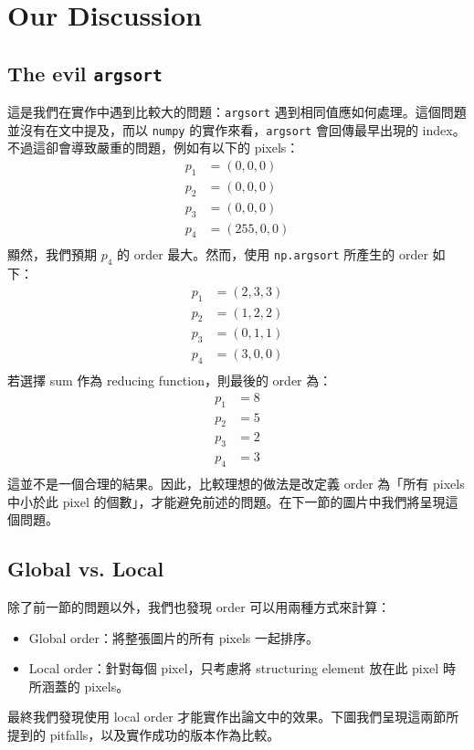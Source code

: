 \section*{Our Discussion}

\subsection*{The evil \texttt{argsort}}
這是我們在實作中遇到比較大的問題：\texttt{argsort} 遇到相同值應如何處理。這個問題並沒有在文中提及，而以 \texttt{numpy} 的實作來看，\texttt{argsort} 會回傳最早出現的 index。不過這卻會導致嚴重的問題，例如有以下的 pixels：
\begin{align*}
    p_1 & = (0, 0, 0)   \\
    p_2 & = (0, 0, 0)   \\
    p_3 & = (0, 0, 0)   \\
    p_4 & = (255, 0, 0) \\
\end{align*}
顯然，我們預期 $p_4$ 的 order 最大。然而，使用 \texttt{np.argsort} 所產生的 order 如下：
\begin{align*}
    p_1 & = (2, 3, 3) \\
    p_2 & = (1, 2, 2) \\
    p_3 & = (0, 1, 1) \\
    p_4 & = (3, 0, 0) \\
\end{align*}
若選擇 sum 作為 reducing function，則最後的 order 為：
\begin{align*}
    p_1 & = 8 \\
    p_2 & = 5 \\
    p_3 & = 2 \\
    p_4 & = 3 \\
\end{align*}
這並不是一個合理的結果。因此，比較理想的做法是改定義 order 為「所有 pixels 中小於此 pixel 的個數」，才能避免前述的問題。在下一節的圖片中我們將呈現這個問題。


\subsection*{Global vs. Local}
除了前一節的問題以外，我們也發現 order 可以用兩種方式來計算：
\begin{itemize}
    \item Global order：將整張圖片的所有 pixels 一起排序。
    \item Local order：針對每個 pixel，只考慮將 structuring element 放在此 pixel 時所涵蓋的 pixels。
\end{itemize}
\clearpage
最終我們發現使用 local order 才能實作出論文中的效果。下圖我們呈現這兩節所提到的 pitfalls，以及實作成功的版本作為比較。



